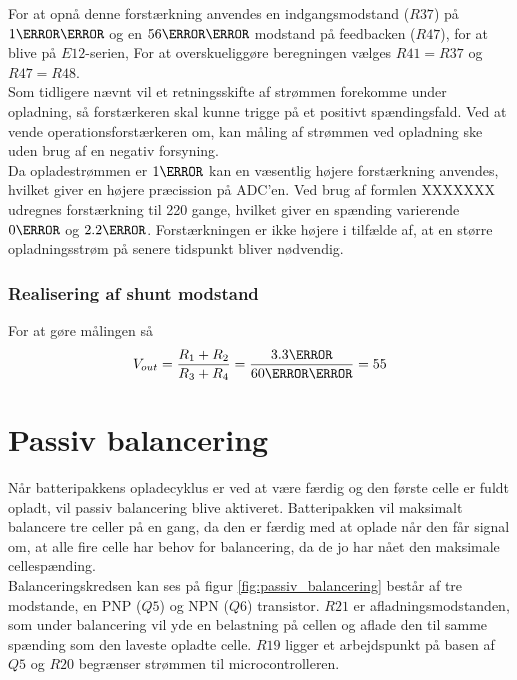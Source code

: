 For at opnå denne forstærkning anvendes en indgangsmodstand ($R37$) på $1\kilo\ohm$ og en $56\kilo\ohm$ modstand på feedbacken ($R47$), for at blive på $E12$-serien,
For at overskueliggøre beregningen vælges $R41 = R37$ og $R47 = R48$.
\\

Som tidligere nævnt vil et retningsskifte af strømmen forekomme under opladning, så forstærkeren skal kunne trigge på et positivt spændingsfald. Ved at vende operationsforstærkeren om, kan måling af strømmen ved opladning ske uden brug af en negativ forsyning.
\\ 

Da opladestrømmen er $1\ampere$ kan en væsentlig højere forstærkning anvendes, hvilket giver en højere præcission på ADC'en. Ved brug af formlen XXXXXXX udregnes forstærkning til 220 gange, hvilket giver en spænding varierende $0\volt$ og $2.2\volt$. Forstærkningen er ikke højere i tilfælde af, at en større opladningsstrøm på senere tidspunkt bliver nødvendig.  

\subsubsection{Realisering af shunt modstand}
For at gøre målingen så 
\begin {equation} 
V_{out} = \frac{R_{1}+R_{2}}{R_{3}+R_{4}} = \frac{3.3\volt}{60\milli\volt} = 55
\end {equation}


\section{Passiv balancering}
Når batteripakkens opladecyklus er ved at være færdig og den første celle er fuldt opladt, vil passiv balancering blive aktiveret. Batteripakken vil maksimalt balancere tre celler på en gang, da den er færdig med at oplade når den får signal om, at alle fire celle har behov for balancering, da de jo har nået den maksimale cellespænding.
\\

Balanceringskredsen kan ses på figur \ref{fig:passiv_balancering} består af tre modstande, en PNP ($Q5$) og NPN ($Q6$) transistor. $R21$ er afladningsmodstanden, som under balancering vil yde en belastning på cellen og aflade den til samme spænding som den laveste opladte celle. $R19$ ligger et arbejdspunkt på basen af $Q5$ og $R20$ begrænser strømmen til microcontrolleren. 
\\

